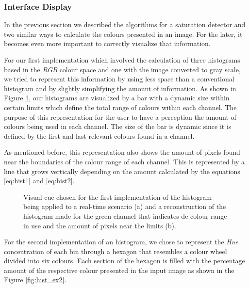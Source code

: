 \subsubsection{Interface Display}
In the previous section we described the algorithms for a saturation detector and two similar ways to calculate the colours presented in an image. For the later, it becomes even more important to correctly visualize that information.

For our first implementation which involved the calculation of three histograms based in the \emph{RGB} colour space and one with the image converted to gray scale, we tried to represent this information by using less space than a conventional histogram and by slightly simplifying the amount of information. As shown in Figure \ref{fig:hist_ex1}, our histograms are visualized by a bar with a dynamic size within certain limits which define the total range of colours within each channel. The purpose of this representation for the user to have a perception the amount of colours being used in each channel. The size of the bar is dynamic since it is defined by the first and last relevant colours found in a channel.

As mentioned before, this representation also shows the amount of pixels found near the boundaries of the colour range of each channel. This is represented by a line that grows vertically depending on the amount calculated by the equations \ref{eq:hist1} and \ref{eq:hist2}.

\begin{figure}[htb]
	\centering
  \caption{Visual cue chosen for the first implementation of the histogram being applied to a real-time scenario (a) and a reconstruction of the histogram made for the green channel that indicates de colour range in use and the amount of pixels near the limits (b).}
	\label{fig:hist_ex1}
\end{figure}

For the second implementation of an histogram, we chose to represent the \emph{Hue} concentration of each bin through a hexagon that resembles a colour wheel divided into six colours. Each section of the hexagon is filled with the percentage amount of the respective colour presented in the input image as shown in the Figure \ref{fig:hist_ex2}.

